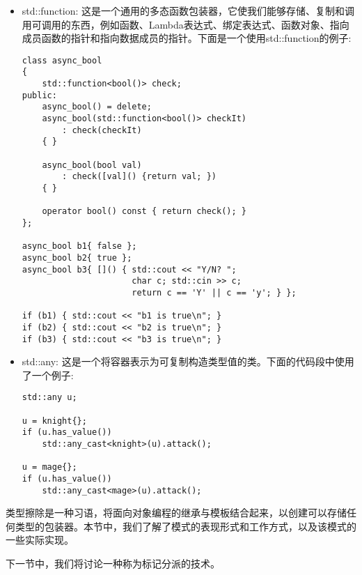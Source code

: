 \begin{itemize}
\item
std::function: 这是一个通用的多态函数包装器，它使我们能够存储、复制和调用可调用的东西，例如函数、Lambda表达式、绑定表达式、函数对象、指向成员函数的指针和指向数据成员的指针。下面是一个使用std::function的例子:

\begin{lstlisting}[style=styleCXX]
class async_bool
{
	std::function<bool()> check;
public:
	async_bool() = delete;
	async_bool(std::function<bool()> checkIt)
		: check(checkIt)
	{ }
	
	async_bool(bool val)
		: check([val]() {return val; })
	{ }
	
	operator bool() const { return check(); }
};

async_bool b1{ false };
async_bool b2{ true };
async_bool b3{ []() { std::cout << "Y/N? ";
					  char c; std::cin >> c;
					  return c == 'Y' || c == 'y'; } };
				  
if (b1) { std::cout << "b1 is true\n"; }
if (b2) { std::cout << "b2 is true\n"; }
if (b3) { std::cout << "b3 is true\n"; }
\end{lstlisting}

\item
std::any: 这是一个将容器表示为可复制构造类型值的类。下面的代码段中使用了一个例子:

\begin{lstlisting}[style=styleCXX]
std::any u;

u = knight{};
if (u.has_value())
	std::any_cast<knight>(u).attack();

u = mage{};
if (u.has_value())
	std::any_cast<mage>(u).attack();
\end{lstlisting}
\end{itemize}

类型擦除是一种习语，将面向对象编程的继承与模板结合起来，以创建可以存储任何类型的包装器。本节中，我们了解了模式的表现形式和工作方式，以及该模式的一些实际实现。

下一节中，我们将讨论一种称为标记分派的技术。



